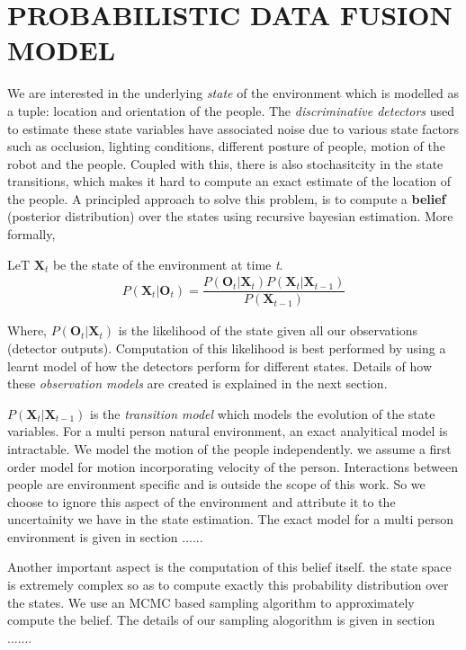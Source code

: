 \section{PROBABILISTIC DATA FUSION MODEL}
We are interested in the underlying \textit{state} of the environment which is modelled as a tuple: location and orientation of the people. The \textit{discriminative detectors} used to estimate these state variables have associated noise due to various state factors such as occlusion, lighting conditions, different posture of people, motion of the robot and the people. Coupled with this, there is also stochasitcity in the state transitions, which makes it hard to compute an exact estimate of the location of the people. A principled approach to solve this problem, is to compute a \textbf{belief} (posterior distribution) over the states using recursive bayesian estimation. More formally,

LeT $\textbf{X}_{t}$ be the state of the environment at time \textit{t}.
\begin{align}
P(\textbf{X}_{t} | \textbf{O}_{t}) = \dfrac{P(\textbf{O}_{t} | \textbf{X}_{t}) P(\textbf{X}_{t}|\textbf{X}_{t-1})} {P(\textbf{X}_{t-1})}
\end{align} 

Where, $P(\textbf{O}_{t} | \textbf{X}_{t})$ is the likelihood of the state given all our observations (detector outputs). Computation of this likelihood is best performed by using a learnt model of how the detectors perform for different states. Details of how these \textit{observation models} are created is explained in the next section.

$P(\textbf{X}_{t}|\textbf{X}_{t-1})$ is the \textit{transition model} which models the evolution of the state variables. For a multi person natural environment, an exact analyitical model is intractable. We model the motion of the people independently. we assume a first order model for motion incorporating velocity of the person. Interactions between people are environment specific and is outside the scope of this work. So we choose to ignore this aspect of the environment and attribute it to the uncertainity we have in the state estimation. The exact model for a multi person environment is given in section ......

Another important aspect is the computation of this belief itself. the state space is extremely complex so as to compute exactly this probability 
distribution over the states. We use an MCMC based sampling algorithm to approximately compute the belief. The details of our sampling alogorithm is given in section .......

